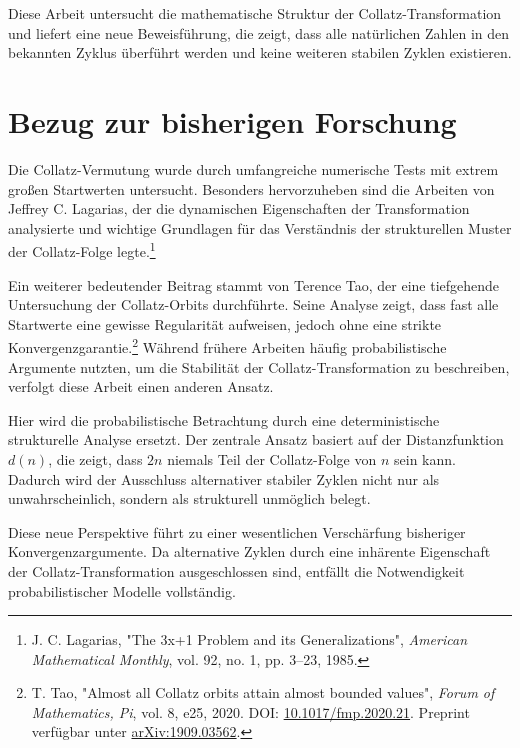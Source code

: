 \documentclass[a4paper,12pt]{article}
\begin{document}
Diese Arbeit untersucht die mathematische Struktur der Collatz-Transformation und liefert eine neue Beweisführung, die zeigt, dass alle natürlichen Zahlen in den bekannten Zyklus überführt werden und keine weiteren stabilen Zyklen existieren.



\section{Bezug zur bisherigen Forschung}
Die Collatz-Vermutung wurde durch umfangreiche numerische Tests mit extrem großen Startwerten untersucht. Besonders hervorzuheben sind die Arbeiten von Jeffrey C. Lagarias, der die dynamischen Eigenschaften der Transformation analysierte und wichtige Grundlagen für das Verständnis der strukturellen Muster der Collatz-Folge legte.\footnote{J. C. Lagarias, "The 3x+1 Problem and its Generalizations", \textit{American Mathematical Monthly}, vol. 92, no. 1, pp. 3–23, 1985.} 

Ein weiterer bedeutender Beitrag stammt von Terence Tao, der eine tiefgehende Untersuchung der Collatz-Orbits durchführte. Seine Analyse zeigt, dass fast alle Startwerte eine gewisse Regularität aufweisen, jedoch ohne eine strikte Konvergenzgarantie.\footnote{T. Tao, "Almost all Collatz orbits attain almost bounded values", \textit{Forum of Mathematics, Pi}, vol. 8, e25, 2020. DOI: \href{https://doi.org/10.1017/fmp.2020.21}{10.1017/fmp.2020.21}. Preprint verfügbar unter \href{https://arxiv.org/abs/1909.03562}{arXiv:1909.03562}.} Während frühere Arbeiten häufig probabilistische Argumente nutzten, um die Stabilität der Collatz-Transformation zu beschreiben, verfolgt diese Arbeit einen anderen Ansatz.

Hier wird die probabilistische Betrachtung durch eine deterministische strukturelle Analyse ersetzt. Der zentrale Ansatz basiert auf der Distanzfunktion \( d(n) \), die zeigt, dass \( 2n \) niemals Teil der Collatz-Folge von \( n \) sein kann. Dadurch wird der Ausschluss alternativer stabiler Zyklen nicht nur als unwahrscheinlich, sondern als strukturell unmöglich belegt.

Diese neue Perspektive führt zu einer wesentlichen Verschärfung bisheriger Konvergenzargumente. Da alternative Zyklen durch eine inhärente Eigenschaft der Collatz-Transformation ausgeschlossen sind, entfällt die Notwendigkeit probabilistischer Modelle vollständig.
\end{document}
